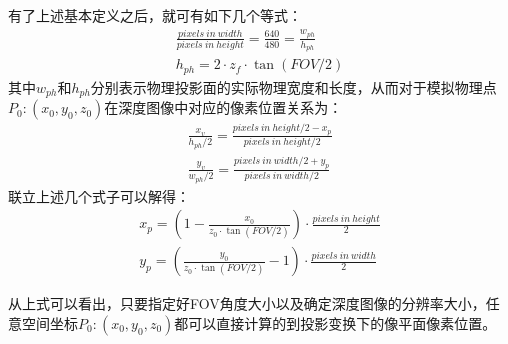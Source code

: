 有了上述基本定义之后，就可有如下几个等式：
\begin{equation}
\begin{aligned}
	\frac{pixels\ in\ width}{pixels\ in\ height}=
	\frac{640}{480}=
	\frac{w_{ph}}{h_{ph}} \\
	h_{ph}=2\cdot z_f \cdot \tan(FOV/2)
\end{aligned}
\end{equation}
其中$w_{ph}$和$h_{ph}$分别表示物理投影面的实际物理宽度和长度，从而对于模拟物理点$P_0:(x_0,y_0,z_0)$在深度图像中对应的像素位置关系为：
\begin{equation}
\begin{aligned}
	\frac{x_v}{h_{ph}/2}=\frac{pixels\ in\ height/2-x_p}{pixels\ in\ height/2} \\
	\frac{y_v}{w_{ph}/2}=\frac{pixels\ in\ width/2+y_p}{pixels\ in\ width/2}
\end{aligned}
\end{equation}
联立上述几个式子可以解得：
\begin{equation}
\begin{aligned}
	x_p=\left(1-\frac{x_0}{z_0\cdot\tan(FOV/2)}\right)\cdot \frac{pixels\ in\ height}{2} \\
	y_p=\left(\frac{y_0}{z_0\cdot\tan(FOV/2)}-1\right)\cdot \frac{pixels\ in\ width}{2}
\end{aligned}
\end{equation}

从上式可以看出，只要指定好FOV角度大小以及确定深度图像的分辨率大小，任意空间坐标$P_0:(x_0,y_0,z_0)$都可以直接计算的到投影变换下的像平面像素位置。




